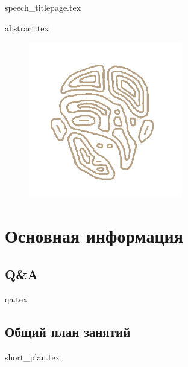 \documentclass[12pt, oneside]{article}
\begin{document}
\thispagestyle{empty}
{speech_titlepage.tex} 
\pagebreak

\thispagestyle{empty}
{abstract.tex}
\begin{figure}[h]
    \centering
    \includegraphics[width=0.6\textwidth]{chelik.png}
    \label{fig:abstract}
\end{figure}
\vfill
\pagebreak

\setcounter{page}{1}
\section{Основная информация}


\subsection{Q\&A}

{qa.tex}

\subsection{Общий план занятий}

{short_plan.tex}
\end{document}
